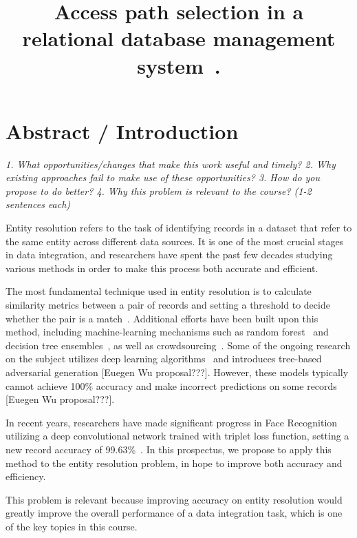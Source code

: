 \documentclass{proc}
\begin{document}
\title{Access path selection in a relational database management system~\cite{selinger1979access}.}


\maketitle

\section{Abstract / Introduction}

\emph{1. What opportunities/changes that make this work useful and timely?
2. Why existing approaches fail to make use of these opportunities?
3. How do you propose to do better?
4. Why this problem is relevant to the course?
(1-2 sentences each)} 

Entity resolution refers to the task of identifying records in a dataset that refer to the same entity across different data sources. It is one of the most crucial stages in data integration, and researchers have spent the past few decades studying various methods in order to make this process both accurate and efficient.

The most fundamental technique used in entity resolution is to calculate similarity metrics between a pair of records and setting a threshold to decide whether the pair is a match~\cite{elmagarmid2007duplicate}. Additional efforts have been built upon this method, including machine-learning mechanisms such as random forest~\cite{varma2017relic} and decision tree ensembles~\cite{yi2017method}, as well as crowdsourcing~\cite{gokhale2014corleone,wang2012crowder}. Some of the ongoing research on the subject utilizes deep learning algorithms~\cite{ebraheem2017deeper} and introduces tree-based adversarial generation [Euegen Wu proposal???]. However, these models typically cannot achieve 100\% accuracy and make incorrect predictions on some records [Euegen Wu proposal???]. 

In recent years, researchers have made significant progress in Face Recognition utilizing a deep convolutional network trained with triplet loss function, setting a new record accuracy of 99.63\%~\cite{schroff2015facenet}. In this prospectus, we propose to apply this method to the entity resolution problem, in hope to improve both accuracy and efficiency.

This problem is relevant because improving accuracy on entity resolution would greatly improve the overall performance of a data integration task, which is one of the key topics in this course.
\end{document}
